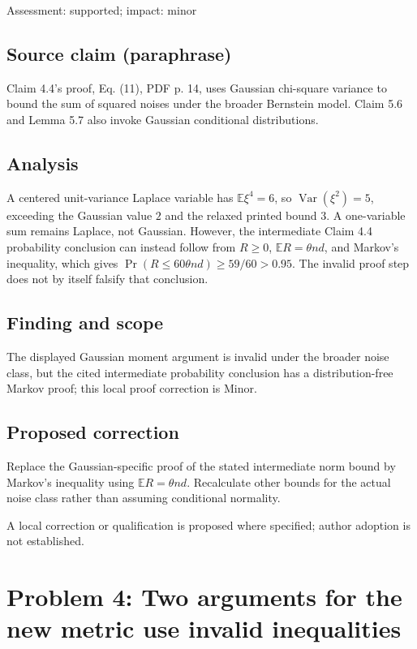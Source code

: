 \documentclass[11pt]{article}
\begin{document}
Assessment: supported; impact: minor

\subsection*{Source claim (paraphrase)}

Claim 4.4's proof, Eq. (11), PDF p. 14, uses Gaussian chi-square variance to bound the sum of squared noises under the broader Bernstein model. Claim 5.6 and Lemma 5.7 also invoke Gaussian conditional distributions.

\subsection*{Analysis}

A centered unit-variance Laplace variable has \(\mathbb E\xi^4=6\), so \(\operatorname{Var}(\xi^2)=5\), exceeding the Gaussian value \(2\) and the relaxed printed bound \(3\). A one-variable sum remains Laplace, not Gaussian. However, the intermediate Claim 4.4 probability conclusion can instead follow from \(R\ge0\), \(\mathbb ER=\theta nd\), and Markov's inequality, which gives \(\Pr(R\le60\theta nd)\ge59/60>0.95\). The invalid proof step does not by itself falsify that conclusion.

\subsection*{Finding and scope}

The displayed Gaussian moment argument is invalid under the broader noise class, but the cited intermediate probability conclusion has a distribution-free Markov proof; this local proof correction is Minor.

\subsection*{Proposed correction}

Replace the Gaussian-specific proof of the stated intermediate norm bound by Markov’s inequality using \(\mathbb ER=\theta nd\). Recalculate other bounds for the actual noise class rather than assuming conditional normality.

A local correction or qualification is proposed where specified; author adoption is not established.

\section*{Problem 4: Two arguments for the new metric use invalid inequalities}
\end{document}
